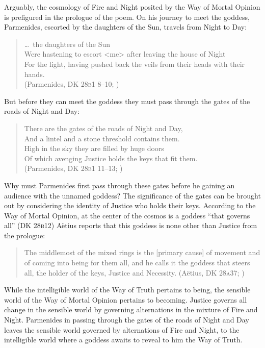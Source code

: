 Arguably, the cosmology of Fire and Night posited by the Way of Mortal Opinion is prefigured in the prologue of the poem. On his journey to meet the goddess, Parmenides, escorted by the daughters of the Sun, travels from Night to Day:
\begin{verse}
    \ldots\ the daughters of the Sun\\
    Were hastening to escort <me> after leaving the house of Night\\
    For the light, having pushed back the veils from their heads with their hands.\\ 
    (Parmenides, DK 28\textsc{b}1 8--10; \citealt[151]{McKirahan:1994ve})
\end{verse}
But before they can meet the goddess they must pass through the gates of the roads of Night and Day:
\begin{verse}
    There are the gates of the roads of Night and Day,\\
    And a lintel and a stone threshold contains them.\\ 
    High in the sky they are filled by huge doors\\
    Of which avenging Justice holds the keys that fit them.\\
    (Parmenides, DK 28\textsc{b}1 11--13; \citealt[151]{McKirahan:1994ve})
\end{verse}
Why must Parmenides first pass through these gates before he gaining an audience with the unnamed goddess? The significance of the gates can be brought out by considering the identity of Justice who holds their keys. According to the Way of Mortal Opinion, at the center of the cosmos is a goddess ``that governs all'' (DK 28\textsc{b}12)  Aëtius reports that this goddess is none other than Justice from the prologue:
\begin{quote}
	The middlemost of the mixed rings is the [primary cause] of movement and of coming into being for them all, and he calls it the goddess that steers all, the holder of the keys, Justice and Necessity. (Aëtius, DK 28\textsc{a}37; \citealt[151]{McKirahan:1994ve})
\end{quote}
While the intelligible world of the Way of Truth pertains to being, the sensible world of the Way of Mortal Opinion pertains to becoming. Justice governs all change in the sensible world by governing alternations in the mixture of Fire and Night. Parmenides in passing through the gates of the roads of Night and Day leaves the sensible world governed by alternations of Fire and Night, to the intelligible world where a goddess awaits to reveal to him the Way of Truth.

